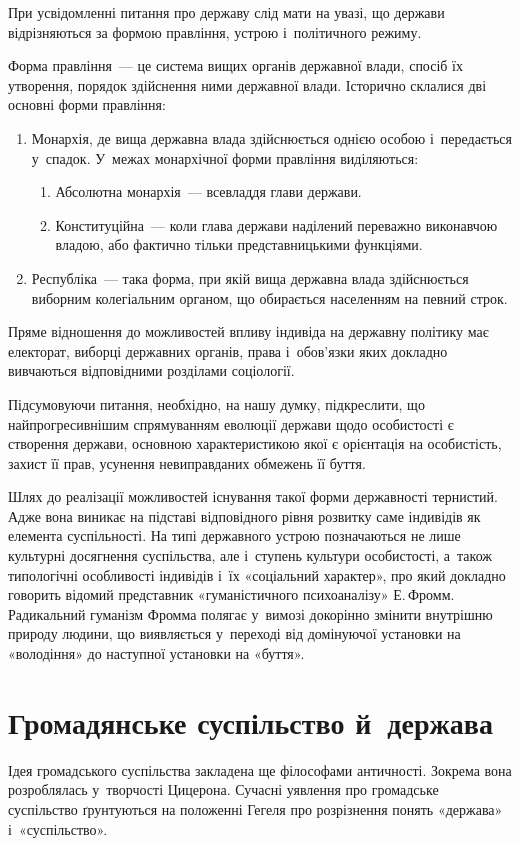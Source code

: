 \documentclass[a5paper,oneside,DIV=12,12pt,headings=small]{scrartcl}
\begin{document}
	При усвідомленні питання про державу слід мати на увазі, що держави відрізняються за формою правління, устрою і~політичного режиму.
	
	Форма правління~— це система вищих органів державної влади, спосіб їх утворення, порядок здійснення ними державної влади. Історично склалися дві основні форми правління:
	\begin{enumerate}
		\item Монархія, де вища державна влада здійснюється однією особою і~передається у~спадок. У~межах монархічної форми правління виділяються:
		\begin{enumerate}
			\item Абсолютна монархія~— всевладдя глави держави.
			\item Конституційна~— коли глава держави наділений переважно виконавчою владою, або фактично тільки представницькими функціями.
		\end{enumerate}
		\item Республіка~— така форма, при якій вища державна влада здійснюється виборним колегіальним органом, що обирається населенням на певний строк.
	\end{enumerate}
	
	Пряме відношення до можливостей впливу індивіда на державну політику має електорат, виборці державних органів, права і~обов'язки яких докладно вивчаються відповідними розділами соціології.
	
	Підсумовуючи питання, необхідно, на нашу думку, підкреслити, що найпрогресивнішим спрямуванням еволюції держави щодо особистості є створення держави, основною характеристикою якої є орієнтація на особистість, захист її прав, усунення невиправданих обмежень її буття.
	
	Шлях до реалізації можливостей існування такої форми державності тернистий. Адже вона виникає на підставі відповідного рівня розвитку саме індивідів як елемента суспільності. На типі державного устрою позначаються не лише культурні досягнення суспільства, але і~ступень культури особистості, а~також типологічні особливості індивідів і~їх «соціальний характер», про який докладно говорить відомий представник «гуманістичного психоаналізу» Е.\,Фромм. Радикальний гуманізм Фромма полягає у~вимозі докорінно змінити внутрішню природу людини, що виявляється у~переході від домінуючої установки на «володіння» до наступної установки на «буття».

	\section{Громадянське суспільство й~держава}
		Ідея громадського суспільства закладена ще філософами античності. Зокрема вона розроблялась у~творчості Цицерона. Сучасні уявлення про громадське суспільство ґрунтуються на положенні Гегеля про розрізнення понять «держава» і~«суспільство».
		
\end{document}
